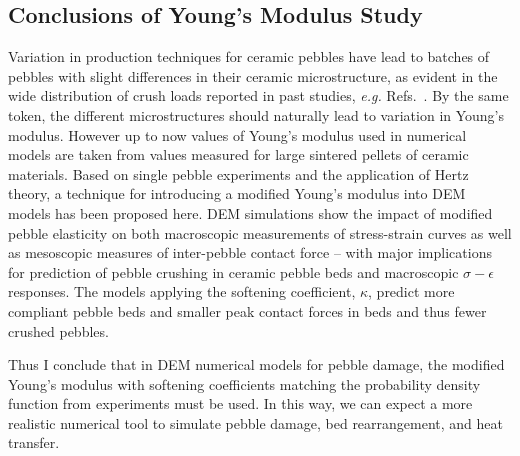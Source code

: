 \subsection{Conclusions of Young's Modulus Study}
Variation in production techniques for ceramic pebbles have lead to batches of pebbles with slight differences in their ceramic microstructure, as evident in the wide distribution of crush loads reported in past studies, \textit{e.g.} Refs.~\cite{Zhao2012,Mandal2012a}. By the same token, the different microstructures should naturally lead to variation in Young’s modulus. However up to now values of Young’s modulus used in numerical models are taken from values measured for large sintered pellets of ceramic materials. Based on single pebble experiments and the application of Hertz theory, a technique for introducing a modified Young’s modulus into DEM models has been proposed here. DEM simulations show the impact of modified pebble elasticity on both macroscopic measurements of stress-strain curves as well as mesoscopic measures of inter-pebble contact force -- with major implications for prediction of pebble crushing in ceramic pebble beds and macroscopic $\sigma-\epsilon$ responses. The models applying the softening coefficient, $\kappa$, predict more compliant pebble beds and smaller peak contact forces in beds and thus fewer crushed pebbles.

Thus I conclude that in DEM numerical models for pebble damage, the modified Young's modulus with softening coefficients matching the probability density function from experiments must be used. In this way, we can expect a more realistic numerical tool to simulate pebble damage, bed rearrangement, and heat transfer.